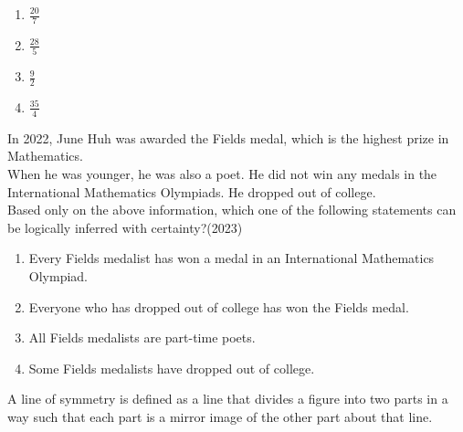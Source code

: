     \begin{enumerate}[label = (\Alph*)]
        \item $\frac{20}{7}$
        \item $\frac{28}{5}$
        \item $\frac{9}{2}$
        \item $\frac{35}{4}$
    \end{enumerate}
    \item[4.] In 2022, June Huh was awarded the Fields medal, which is the highest prize in
    Mathematics.\\When he was younger, he was also a poet. He did not win any medals in the
    International Mathematics Olympiads. He dropped out of college.\\ Based only on the above information, which one of the following statements can be
    logically inferred with certainty?\hfill (2023)
    \begin{enumerate}[label = (\Alph*)]
        \item Every Fields medalist has won a medal in an International Mathematics Olympiad.
        \item Everyone who has dropped out of college has won the Fields medal.
        \item All Fields medalists are part-time poets.
        \item Some Fields medalists have dropped out of college.
    \end{enumerate}
    \item[5.]  A line of symmetry is defined as a line that divides a figure into two parts in a way
    such that each part is a mirror image of the other part about that line.\\


